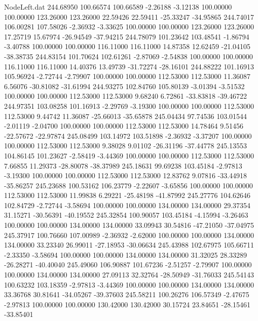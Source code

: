 \begin{filecontents}{NodeLeft.dat}
 244.68950  100.66574  100.66589    -2.26188   -3.12138  100.00000  100.00000  123.26000  123.26000   22.59426   22.59411  -25.33247  -34.95865
 244.74017  106.00281  107.58026    -2.36932   -3.33625  100.00000  100.00000  123.26000  123.26000   17.25719   15.67974  -26.94549  -37.94215
 244.78079  101.23642  103.48541    -1.86794   -3.40788  100.00000  100.00000  116.11000  116.11000   14.87358   12.62459  -21.04105  -38.38735
 244.83154  101.70624  102.61261    -2.87069   -2.54838  100.00000  100.00000  116.11000  116.11000   14.40376   13.49739  -31.72274  -28.16101
 244.88222  101.16913  105.96924    -2.72744   -2.79907  100.00000  100.00000  112.53000  112.53000   11.36087    6.56076  -30.81082  -31.61994
 244.93275  102.84760  105.80139    -3.01394   -3.51532  100.00000  100.00000  112.53000  112.53000    9.68240    6.72861  -33.83818  -39.46722
 244.97351  103.08258  101.16913    -2.29769   -3.19300  100.00000  100.00000  112.53000  112.53000    9.44742   11.36087  -25.66013  -35.65878
 245.04434   97.74536  103.01544    -2.01119   -2.04700  100.00000  100.00000  112.53000  112.53000   14.78464    9.51456  -22.57672  -22.97874
 245.08499  103.14972  103.51898    -2.36932   -3.37207  100.00000  100.00000  112.53000  112.53000    9.38028    9.01102  -26.31196  -37.44778
 245.13553  104.86145  101.23627    -2.58419   -3.44369  100.00000  100.00000  112.53000  112.53000    7.66855   11.29373  -28.80078  -38.37989
 245.18631   99.69238  103.45184    -2.97813   -3.19300  100.00000  100.00000  112.53000  112.53000   12.83762    9.07816  -33.44918  -35.86257
 245.23688  100.53162  106.23779    -2.22607   -3.65856  100.00000  100.00000  112.53000  112.53000   11.99838    6.29221  -25.48198  -41.87992
 245.27776  104.62646  102.84729    -2.72744   -3.58694  100.00000  100.00000  134.00000  134.00000   29.37354   31.15271  -30.56391  -40.19552
 245.32854  100.90057  103.45184    -4.15994   -3.26463  100.00000  100.00000  134.00000  134.00000   33.09943   30.54816  -47.21050  -37.04975
 245.37917  100.76660  107.00989    -2.36932   -2.62000  100.00000  100.00000  134.00000  134.00000   33.23340   26.99011  -27.18953  -30.06634
 245.43988  102.67975  105.66711    -2.33350   -3.58694  100.00000  100.00000  134.00000  134.00000   31.32025   28.33289  -26.28271  -40.40040
 245.49060  106.90887  101.67236    -2.51257   -2.79907  100.00000  100.00000  134.00000  134.00000   27.09113   32.32764  -28.50949  -31.76033
 245.54143  100.63232  103.18359    -2.97813   -3.44369  100.00000  100.00000  134.00000  134.00000   33.36768   30.81641  -34.05267  -39.37603
 245.58211  100.26276  106.57349    -2.47675   -2.97813  100.00000  100.00000  130.42000  130.42000   30.15724   23.84651  -28.15461  -33.85401

\end{filecontents}
